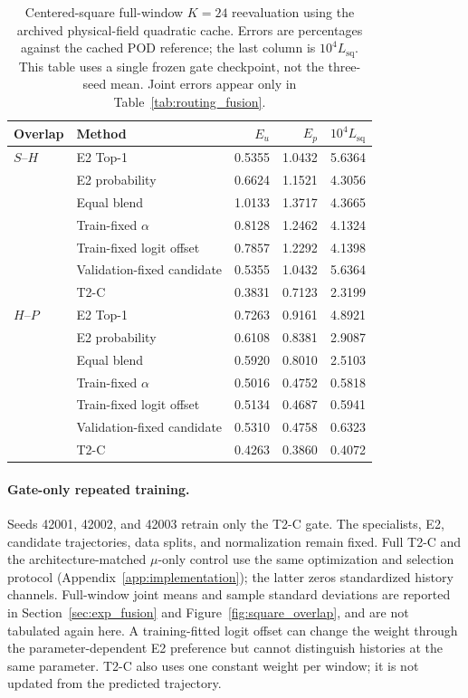 \begin{table}[H]
\centering
\caption{Centered-square full-window $K=24$ reevaluation using the
archived physical-field quadratic cache. Errors are percentages against
the cached POD reference; the last column is $10^4 L_{\mathrm{sq}}$.
This table uses a single frozen gate checkpoint, not the three-seed mean.
Joint errors appear only in Table~\ref{tab:routing_fusion}.}
\label{tab:t2c_full_window_controls}
\small
\setlength{\tabcolsep}{3.5pt}
\begin{tabular}{@{}llrrr@{}}
\toprule
Overlap & Method & $E_u$ & $E_p$ & $10^4L_{\mathrm{sq}}$\\
\midrule
$S$--$H$ & E2 Top-1 & 0.5355 & 1.0432 & 5.6364 \\
 & E2 probability & 0.6624 & 1.1521 & 4.3056 \\
 & Equal blend & 1.0133 & 1.3717 & 4.3665 \\
 & Train-fixed $\alpha$ & 0.8128 & 1.2462 & 4.1324 \\
 & Train-fixed logit offset & 0.7857 & 1.2292 & 4.1398 \\
 & Validation-fixed candidate & 0.5355 & 1.0432 & 5.6364 \\
 & T2-C & 0.3831 & 0.7123 & 2.3199 \\
\midrule
$H$--$P$ & E2 Top-1 & 0.7263 & 0.9161 & 4.8921 \\
 & E2 probability & 0.6108 & 0.8381 & 2.9087 \\
 & Equal blend & 0.5920 & 0.8010 & 2.5103 \\
 & Train-fixed $\alpha$ & 0.5016 & 0.4752 & 0.5818 \\
 & Train-fixed logit offset & 0.5134 & 0.4687 & 0.5941 \\
 & Validation-fixed candidate & 0.5310 & 0.4758 & 0.6323 \\
 & T2-C & 0.4263 & 0.3860 & 0.4072 \\
\bottomrule
\end{tabular}
\end{table}

\paragraph{Gate-only repeated training.}
Seeds 42001, 42002, and 42003 retrain only the T2-C gate.
The specialists, E2, candidate trajectories, data splits, and
normalization remain fixed. Full T2-C and the architecture-matched
$\mu$-only control use the same optimization and selection protocol
(Appendix~\ref{app:implementation}); the latter zeros standardized
history channels. Full-window joint means and sample standard deviations
are reported in Section~\ref{sec:exp_fusion} and
Figure~\ref{fig:square_overlap}, and are not tabulated again here.
A training-fitted logit offset can change the weight through the
parameter-dependent E2 preference but cannot distinguish histories
at the same parameter. T2-C also uses one constant weight per window;
it is not updated from the predicted trajectory.

